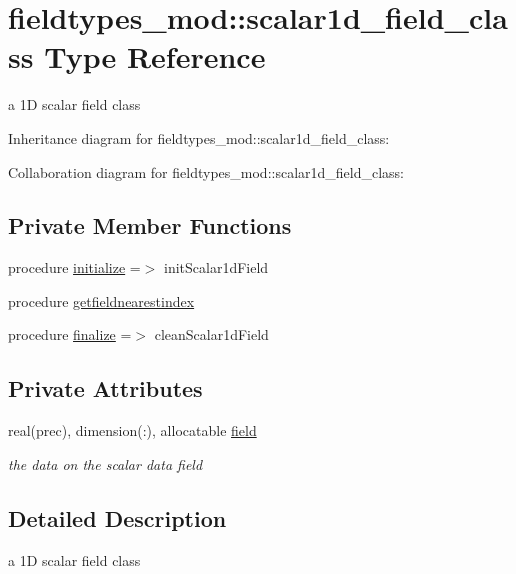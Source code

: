\hypertarget{structfieldtypes__mod_1_1scalar1d__field__class}{}\section{fieldtypes\+\_\+mod\+:\+:scalar1d\+\_\+field\+\_\+class Type Reference}
\label{structfieldtypes__mod_1_1scalar1d__field__class}


a 1D scalar field class  




Inheritance diagram for fieldtypes\+\_\+mod\+:\+:scalar1d\+\_\+field\+\_\+class\+:


Collaboration diagram for fieldtypes\+\_\+mod\+:\+:scalar1d\+\_\+field\+\_\+class\+:
\subsection*{Private Member Functions}
\begin{DoxyCompactItemize}
\item 
procedure \mbox{\hyperlink{structfieldtypes__mod_1_1scalar1d__field__class_aa5e83bedb5d56d7e666fde274435a04f}{initialize}} =$>$ init\+Scalar1d\+Field
\item 
procedure \mbox{\hyperlink{structfieldtypes__mod_1_1scalar1d__field__class_a006ddd4810ef1ddccef091a4600b9925}{getfieldnearestindex}}
\item 
procedure \mbox{\hyperlink{structfieldtypes__mod_1_1scalar1d__field__class_a6e7993e87fad9d6b56af43ae1bb0a36a}{finalize}} =$>$ clean\+Scalar1d\+Field
\end{DoxyCompactItemize}
\subsection*{Private Attributes}
\begin{DoxyCompactItemize}
\item 
real(prec), dimension(\+:), allocatable \mbox{\hyperlink{structfieldtypes__mod_1_1scalar1d__field__class_ab5ea19982bf6390d99095d2ed1509263}{field}}
\begin{DoxyCompactList}\small\item\em the data on the scalar data field \end{DoxyCompactList}\end{DoxyCompactItemize}


\subsection{Detailed Description}
a 1D scalar field class 

